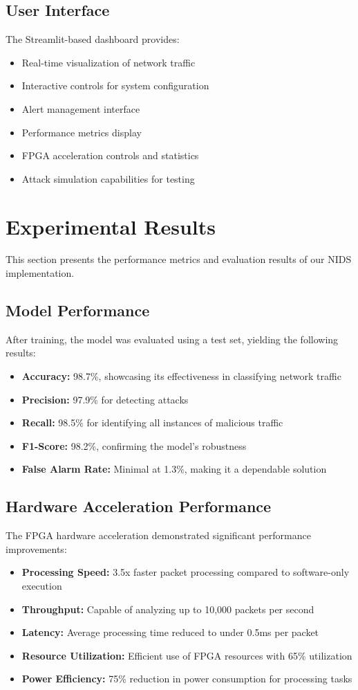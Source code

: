 \documentclass[12pt]{article}
\begin{document}
\subsection{User Interface}
The Streamlit-based dashboard provides:
\begin{itemize}
  \item Real-time visualization of network traffic
  \item Interactive controls for system configuration
  \item Alert management interface
  \item Performance metrics display
  \item FPGA acceleration controls and statistics
  \item Attack simulation capabilities for testing
\end{itemize}

\section{Experimental Results}
This section presents the performance metrics and evaluation results of our NIDS implementation.

\subsection{Model Performance}
After training, the model was evaluated using a test set, yielding the following results:
\begin{itemize}
  \item \textbf{Accuracy:} 98.7\%, showcasing its effectiveness in classifying network traffic
  \item \textbf{Precision:} 97.9\% for detecting attacks
  \item \textbf{Recall:} 98.5\% for identifying all instances of malicious traffic
  \item \textbf{F1-Score:} 98.2\%, confirming the model's robustness
  \item \textbf{False Alarm Rate:} Minimal at 1.3\%, making it a dependable solution
\end{itemize}

\subsection{Hardware Acceleration Performance}
The FPGA hardware acceleration demonstrated significant performance improvements:
\begin{itemize}
  \item \textbf{Processing Speed:} 3.5x faster packet processing compared to software-only execution
  \item \textbf{Throughput:} Capable of analyzing up to 10,000 packets per second
  \item \textbf{Latency:} Average processing time reduced to under 0.5ms per packet
  \item \textbf{Resource Utilization:} Efficient use of FPGA resources with 65\% utilization
  \item \textbf{Power Efficiency:} 75\% reduction in power consumption for processing tasks
\end{itemize}
\end{document}
